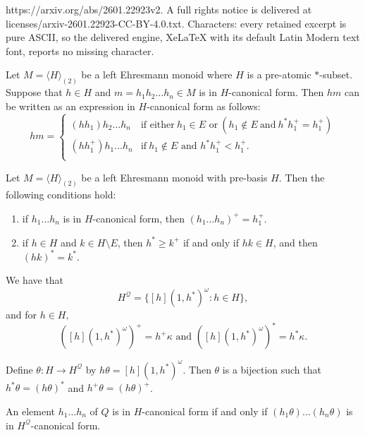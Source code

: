 \documentclass[10pt,a4paper]{amsart}
\begin{document}
https://arxiv.org/abs/2601.22923v2. A full rights notice is delivered at licenses/arxiv-2601.22923-CC-BY-4.0.txt. Characters: every retained excerpt is pure ASCII, so the delivered engine, XeLaTeX with its default Latin Modern text font, reports no missing character.
\begin{lem}\label{h+m-Hormal form}
 Let $M=\langle H\rangle_{(2)}$  be a left Ehresmann monoid  where  $H$ is a  pre-atomic $*$-subset. 
 Suppose that $h \in H$ and $m = h_1h_2\dots h_n\in M$ is in $H$-canonical form. Then $hm$ can be written as an expression in $H$-canonical form as follows:
$$ hm=
	\begin{cases}
        (hh_1)h_2\dots h_n & \mbox{if\ either}\ h_1\in E\mbox{ or}\ (h_1\notin E\ \text{and}\ h^*h_1^+= h_1^+)\\
        (hh_1^+)h_1\dots h_n & \mbox{if}\  h_1\notin E\mbox{ and } h^*h_1^+< h_1^+.\\
	\end{cases}$$
\end{lem}

\begin{lem}\label{prop}\label{prop:extra} 
Let $M=\langle H\rangle_{(2)}$ be a left Ehresmann monoid with 
pre-basis $H$. Then the following conditions hold:

\begin{enumerate}
    \item[$(i)$] if  $h_1\dots h_n$ is  in $H$-canonical form, then $(h_1\dots h_n)^+=h_1^+$.
   
    \item[$(ii)$]  if $h \in H$ and $k \in H\setminus E$, then  $h^{\ast} \geq k^{+}$ if and only if  $hk\in H$, and then $(hk)^\ast = k^\ast$.
\end{enumerate}
\end{lem}

\begin{lem}\label{lem:htrick} We have that
\[H^{\mathcal{Q}}=\{ [h](1,h^*)^\omega:h\in H\},\]
and for $h\in H,$ 
\[([h](1,h^*)^\omega)^+=h^+\kappa\mbox{ and }
([h](1,h^*)^\omega)^*=h^*\kappa.\]
\end{lem}

\begin{lem}\label{lem:theta} Define $\theta:H\rightarrow H^{\mathcal{Q}}$ by  $h\theta=[h](1,h^*)^\omega$.
Then $\theta$ is a bijection such that 
$h^*\theta=(h\theta)^*$ and $h^+\theta=(h\theta)^+$.
\end{lem}

\begin{cor}\label{cor:nf} An element $h_1\dots h_n$ of $Q$ is in $H$-canonical form if and only if 
$(h_1\theta)\dots (h_n\theta)$ is in $H^{\mathcal{Q}}$-canonical form.
\end{cor}
\end{document}
